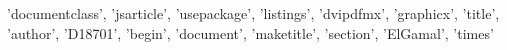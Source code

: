 {'documentclass', 'jsarticle', 'usepackage', 'listings', 'dvipdfmx', 'graphicx', 'title', 'author', 'D18701', 'begin', 'document', 'maketitle', 'section', 'ElGamal', 'times'}
